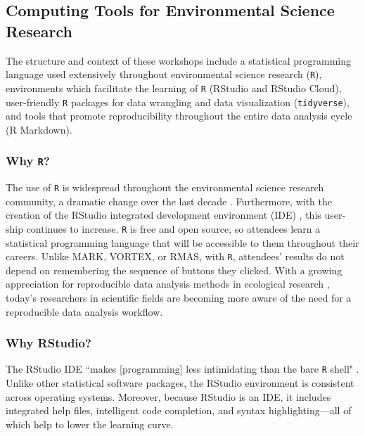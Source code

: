 \documentclass[12pt]{article}
\begin{document}
\subsection{Computing Tools for Environmental Science Research}  

\noindent The structure and context of these workshops include a statistical
programming language used extensively throughout environmental science research
(\texttt{R}), environments which facilitate the learning of \texttt{R}
(RStudio and RStudio Cloud), user-friendly \texttt{R} packages for data
wrangling and data visualization (\texttt{tidyverse}), and tools that promote
reproducibility throughout the entire data analysis cycle (R Markdown).

\subsubsection{Why \texttt{R}?} 

\noindent The use of \texttt{R} is widespread throughout the environmental science
research community, a dramatic change over the last decade \citep{Rpopular}. 
Furthermore, with the creation of the RStudio integrated development 
environment (IDE) \citep{rstudio}, this user-ship continues to increase. 
\texttt{R} is free and open source, so attendees learn a statistical
programming language that will be accessible to them throughout their careers.
Unlike MARK, VORTEX, or RMAS, with \texttt{R}, attendees' results do not depend
on remembering the sequence of buttons they clicked. With a growing appreciation
for reproducible data analysis methods in ecological research 
\citep{reproducibilty-comment, repeatability, pva, reproducibility_ecology},
today's researchers in scientific fields are becoming more aware of the need for
a reproducible data analysis workflow. 

\subsubsection{Why RStudio?}

\noindent The RStudio IDE ``makes [programming] less
intimidating than the bare \texttt{R} shell" \citep[p.\ 59]{mine}. Unlike other 
statistical software packages, the RStudio environment is consistent across
operating systems. Moreover, because RStudio is an IDE, it includes integrated
help files, intelligent code completion, and syntax highlighting---all of which
help to lower the learning curve. 
\end{document}
